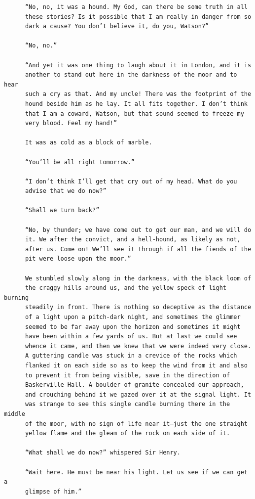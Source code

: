 \documentclass{article}
\begin{document}
\begin{verbatim}
      “No, no, it was a hound. My God, can there be some truth in all
      these stories? Is it possible that I am really in danger from so
      dark a cause? You don’t believe it, do you, Watson?”

      “No, no.”

      “And yet it was one thing to laugh about it in London, and it is
      another to stand out here in the darkness of the moor and to hear
      such a cry as that. And my uncle! There was the footprint of the
      hound beside him as he lay. It all fits together. I don’t think
      that I am a coward, Watson, but that sound seemed to freeze my
      very blood. Feel my hand!”

      It was as cold as a block of marble.

      “You’ll be all right tomorrow.”

      “I don’t think I’ll get that cry out of my head. What do you
      advise that we do now?”

      “Shall we turn back?”

      “No, by thunder; we have come out to get our man, and we will do
      it. We after the convict, and a hell-hound, as likely as not,
      after us. Come on! We’ll see it through if all the fiends of the
      pit were loose upon the moor.”

      We stumbled slowly along in the darkness, with the black loom of
      the craggy hills around us, and the yellow speck of light burning
      steadily in front. There is nothing so deceptive as the distance
      of a light upon a pitch-dark night, and sometimes the glimmer
      seemed to be far away upon the horizon and sometimes it might
      have been within a few yards of us. But at last we could see
      whence it came, and then we knew that we were indeed very close.
      A guttering candle was stuck in a crevice of the rocks which
      flanked it on each side so as to keep the wind from it and also
      to prevent it from being visible, save in the direction of
      Baskerville Hall. A boulder of granite concealed our approach,
      and crouching behind it we gazed over it at the signal light. It
      was strange to see this single candle burning there in the middle
      of the moor, with no sign of life near it—just the one straight
      yellow flame and the gleam of the rock on each side of it.

      “What shall we do now?” whispered Sir Henry.

      “Wait here. He must be near his light. Let us see if we can get a
      glimpse of him.”


\end{verbatim}
\end{document}
